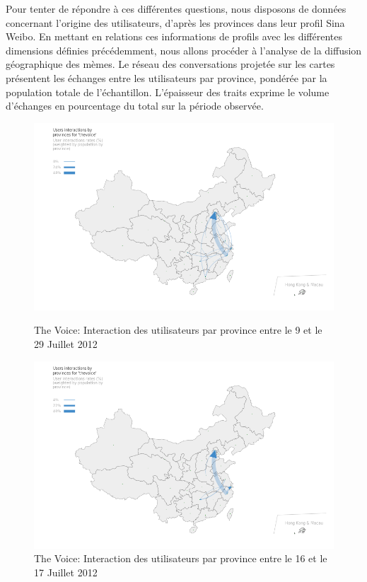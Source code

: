 Pour tenter de r\'epondre \`a ces diff\'erentes questions, nous disposons de donn\'ees concernant l{\textquoteright}origine des utilisateurs, d{\textquoteright}apr\`es les provinces dans leur profil Sina Weibo. En mettant en relations ces informations de profils avec les diff\'erentes dimensions d\'efinies pr\'ec\'edemment, nous allons proc\'eder \`a l{\textquoteright}analyse de la diffusion g\'eographique des m\`emes. Le réseau des conversations projetée sur les cartes présentent les échanges entre les utilisateurs par province, pondérée par la population totale de l'échantillon. L{\textquoteright}\'epaisseur des traits exprime le volume d{\textquoteright}\'echanges en pourcentage du total sur la p\'eriode observ\'ee.

\begin{figure}[h!]
  \begin{minipage}[c]{.45\linewidth}
    \centering
    \includegraphics[scale=.3]{figures/chap4/chapitre4-img19.png}
    \caption{
      The Voice: Interaction des utilisateurs par province entre le 9 et le 29 Juillet 2012
    }
    \label{fig:geo-voice-t1}
  \end{minipage}
  \begin{minipage}[c]{.45\linewidth}
    \centering
    \includegraphics[scale=.3]{figures/chap4/chapitre4-img20.png}    
    \caption{
      The Voice: Interaction des utilisateurs par province entre le 16 et le 17 Juillet 2012
    }
    \label{fig:geo-voice-t2}
  \end{minipage}
\end{figure}

